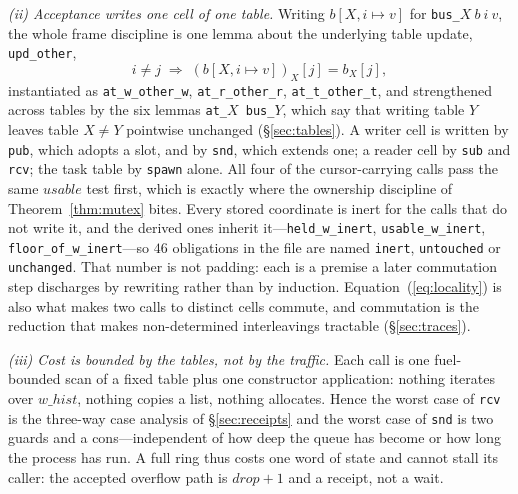 \documentclass[10pt,journal,compsoc,twocolumn]{article}
\theoremstyle{definition}
\theoremstyle{remark}
\theoremstyle{plain}
\newcommand{\ctr}[1]{\texttt{#1}}
\begin{document}
\emph{(ii) Acceptance writes one cell of one table.} Writing
\(b[X,i \mapsto v]\) for \ctr{bus\_$X$}\(~b~i~v\), the whole frame discipline is
one lemma about the underlying table update, \ctr{upd\_other},
\begin{equation}
\label{eq:locality}
i \neq j \;\Longrightarrow\; (b[X,i \mapsto v])_X[j] = b_X[j],
\end{equation}
instantiated as \ctr{at\_w\_other\_w}, \ctr{at\_r\_other\_r},
\ctr{at\_t\_other\_t}, and strengthened across tables by the six lemmas
\ctr{at\_\(X\) bus\_\(Y\)}, which say that writing table \(Y\) leaves table \(X
\neq Y\) pointwise unchanged (\S\ref{sec:tables}). A writer cell is written by
\ctr{pub}, which adopts a slot, and by \ctr{snd}, which extends one; a reader
cell by \ctr{sub} and \ctr{rcv}; the task table by \ctr{spawn} alone. All four
of the cursor-carrying calls pass the same \(\mathit{usable}\) test first, which
is exactly where the ownership discipline of Theorem~\ref{thm:mutex} bites. Every
stored coordinate is inert for the calls that do not write it, and the derived
ones inherit it---\ctr{held\_w\_inert}, \ctr{usable\_w\_inert},
\ctr{floor\_of\_w\_inert}---so \(46\) obligations in the file are named
\ctr{inert}, \ctr{untouched} or \ctr{unchanged}. That number is not padding:
each is a premise a later commutation step discharges by rewriting rather than
by induction. Equation~(\ref{eq:locality}) is also what makes two calls to
distinct cells commute, and commutation is the reduction that makes
non-determined interleavings tractable (\S\ref{sec:traces}).

\emph{(iii) Cost is bounded by the tables, not by the traffic.} Each call is one
fuel-bounded scan of a fixed table plus one constructor application: nothing
iterates over \(\mathit{w\_hist}\), nothing copies a list, nothing allocates.
Hence the worst case of \ctr{rcv} is the three-way case analysis of
\S\ref{sec:receipts} and the worst case of \ctr{snd} is two guards and a
cons---independent of how deep the queue has become or how long the process has
run. A full ring thus costs one word of state and cannot stall its caller:
the accepted overflow path is \(\mathit{drop}{+}1\) and a receipt, not a wait.
\end{document}
